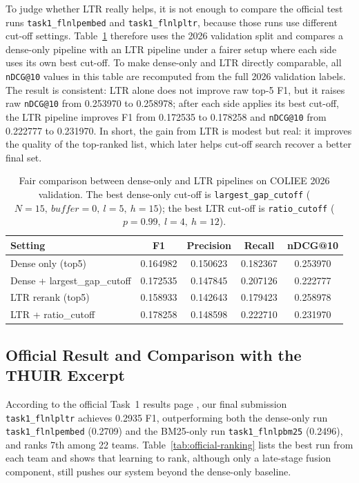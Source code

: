 To judge whether LTR really helps, it is not enough to compare the official test runs \texttt{task1\_flnlpembed} and \texttt{task1\_flnlpltr}, because those runs use different cut-off settings. Table~\ref{tab:ltr-contribution} therefore uses the 2026 validation split and compares a dense-only pipeline with an LTR pipeline under a fairer setup where each side uses its own best cut-off. To make dense-only and LTR directly comparable, all \texttt{nDCG@10} values in this table are recomputed from the full 2026 validation labels. The result is consistent: LTR alone does not improve raw top-5 F1, but it raises raw \texttt{nDCG@10} from 0.253970 to 0.258978; after each side applies its best cut-off, the LTR pipeline improves F1 from 0.172535 to 0.178258 and \texttt{nDCG@10} from 0.222777 to 0.231970. In short, the gain from LTR is modest but real: it improves the quality of the top-ranked list, which later helps cut-off search recover a better final set.

\begin{table}[t]
  \centering
  \scriptsize
  \begin{tabular}{@{}p{}cccc@{}}
    \toprule
    Setting & F1 & Precision & Recall & nDCG@10 \\
    \midrule
    Dense only (top5) & 0.164982 & 0.150623 & 0.182367 & 0.253970 \\
    Dense + largest\_gap\_cutoff & 0.172535 & 0.147845 & 0.207126 & 0.222777 \\
    LTR rerank (top5) & 0.158933 & 0.142643 & 0.179423 & 0.258978 \\
    LTR + ratio\_cutoff & 0.178258 & 0.148598 & 0.222710 & 0.231970 \\
    \bottomrule
  \end{tabular}
  \caption{Fair comparison between dense-only and LTR pipelines on COLIEE 2026 validation. The best dense-only cut-off is \texttt{largest\_gap\_cutoff} ($N=15,\ buffer=0,\ l=5,\ h=15$); the best LTR cut-off is \texttt{ratio\_cutoff} ($p=0.99,\ l=4,\ h=12$).}
  \label{tab:ltr-contribution}
\end{table}

\subsection{Official Result and Comparison with the THUIR Excerpt}

According to the official Task~1 results page \cite{coliee2026task1results}, our final submission \texttt{task1\_flnlpltr} achieves 0.2935 F1, outperforming both the dense-only run \texttt{task1\_flnlpembed} (0.2709) and the BM25-only run \texttt{task1\_flnlpbm25} (0.2496), and ranks 7th among 22 teams. Table~\ref{tab:official-ranking} lists the best run from each team and shows that learning to rank, although only a late-stage fusion component, still pushes our system beyond the dense-only baseline.

